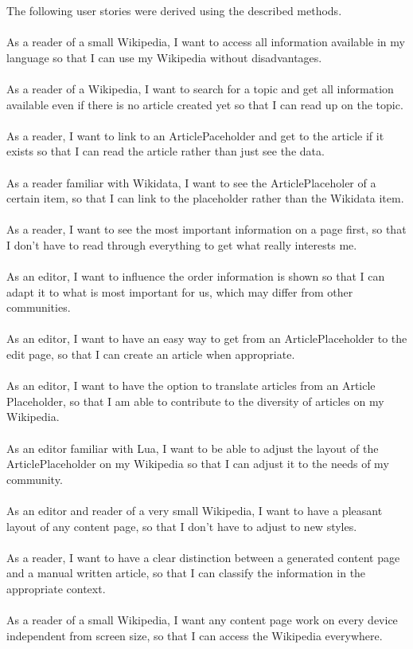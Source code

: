 The following user stories were derived using the described methods. \\
\\
As a reader of a small Wikipedia, I want to access all information available in my language so that I can use my Wikipedia without disadvantages. \\
\\
As a reader of a Wikipedia, I want to search for a topic and get all information available even if there is no article created yet so that I can read up on the topic. \\
\\
As a reader, I want to link to an ArticlePaceholder and get to the article if it exists so that I can read the article rather than just see the data. \\
\\
As a reader familiar with Wikidata, I want to see the ArticlePlaceholer of a certain item, so that I can link to the placeholder rather than the Wikidata item. \\
\\
As a reader, I want to see the most important information on a page first, so that I don't have to read through everything to get what really interests me. \\
\\
As an editor, I want to influence the order information is shown so that I can adapt it to what is most important for us, which may differ from other communities.\\
\\
As an editor, I want to have an easy way to get from an ArticlePlaceholder to the edit page, so that I can create an article when appropriate. \\
\\
As an editor, I want to have the option to translate articles from an Article Placeholder, so that I am able to contribute to the diversity of articles on my Wikipedia. \\
\\
As an editor familiar with Lua, I want to be able to adjust the layout of the ArticlePlaceholder on my Wikipedia so that I can adjust it to the needs of my community. \\
\\
As an editor and reader of a very small Wikipedia, I want to have a pleasant layout of any content page, so that I don't have to adjust to new styles. \\
\\
As a reader, I want to have a clear distinction between a generated content page and a manual written article, so that I can classify the information in the appropriate context. \\
\\
As a reader of a small Wikipedia, I want any content page work on every device independent from screen size, so that I can access the Wikipedia everywhere. 